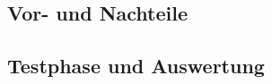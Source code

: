 \subsection{Vor- und Nachteile}
\label{sec:Vorschläge}
\vfill

\subsection{Testphase und Auswertung}
\label{subsec:TestenVonCRS}
\vfill

